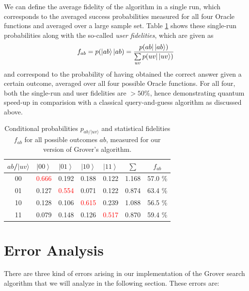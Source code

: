 We can define the average fidelity of the algorithm in a single run, which corresponds to the averaged success probabilities measured for all four Oracle functions and averaged over a large sample set. Table \ref{tab:Probabilities-for-obtaining} shows these single-run probabilities along with the so-called {\it user fidelities}, which are given as
%
\begin{equation}
f_{ab} = p(\left| ab \right>|ab) = \frac{p(ab |\left| ab \right>)}{\sum\limits_{uv}p(uv|\left| uv \right>)} 
\end{equation}
%
and correspond to the probability of having obtained the correct answer given a certain outcome, averaged over all four possible Oracle functions. For all four, both the single-run and user fidelities are $> 50 \%$, hence demonstrating quantum speed-up in comparision with a classical query-and-guess algorithm as discussed above.

\begin{table}[H]
\begin{centering}
\begin{tabular}{|c|c|c|c|c|c|c|}
\hline 
$ab$/$|uv\rangle$ & $\left|00\right\rangle $ & $\left|01\right\rangle $ & $\left|10\right\rangle $ & $\left|11\right\rangle $ & $\sum$ & $f_{ab}$\tabularnewline
\hline
\hline 
00 & \textcolor{red}{0.666} & 0.192 & 0.188 & 0.122 & 1.168 & 57.0 \%\tabularnewline
\hline 
01 & 0.127 & \textcolor{red}{0.554} & 0.071 & 0.122 & 0.874 & 63.4 \%\tabularnewline
\hline 
10 & 0.128 & 0.106 & \textcolor{red}{0.615} & 0.239 & 1.088 & 56.5 \%\tabularnewline
\hline 
11 & 0.079 & 0.148 & 0.126 & \textcolor{red}{0.517} & 0.870 & 59.4 \%\tabularnewline
\hline
\end{tabular}
\par\end{centering}

\caption{\label{tab:Probabilities-for-obtaining}Conditional probabilities
$p_{ab/|uv\rangle}$ and statistical fidelities $f_{ab}$ for all
possible outcomes $ab$, measured for our version of Grover's algorithm.}

\end{table}

\section{Error Analysis}

There are three kind of errors arising in our implementation of the Grover search algorithm that we will analyze in the following section. These errors are:

